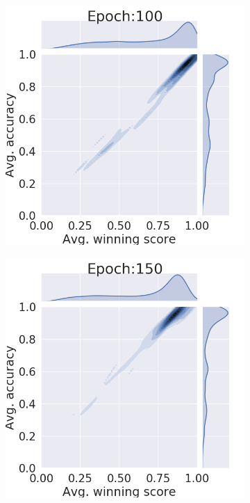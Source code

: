 \begin{figure}[htb]
\begin{subfigure}[b]{0.19\textwidth}
         \caption{}
     \end{subfigure}
     \hfill
     \begin{subfigure}[b]{0.19\textwidth}
         \centering
         \noindent\includegraphics[width=\textwidth]{images/joint_plot/mixup/100.png}
         \caption{}
     \end{subfigure}
          \centering
     \begin{subfigure}[b]{0.19\textwidth}
         \centering
         \noindent\includegraphics[width=\textwidth]{images/joint_plot/mixup/150.png}

\end{subfigure}
\end{figure}
